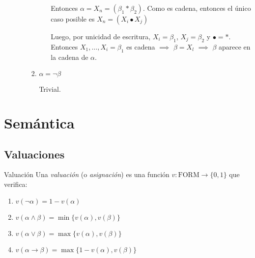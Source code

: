 \begin{itemize}
\begin{itemize}
\begin{enumerate}
\begin{itemize}
                            Entonces $\alpha = X_n = (\beta_1 * \beta_2)$.
                            Como es cadena, entonces el único caso posible
                            es $X_n = (X_i \bullet X_j)$ %

                            Luego, por unicidad de escritura, $X_i = \beta_1$,
                            $X_j = \beta_2$ y $\bullet = *$.
                            Entonces $X_1, \dotsc, X_i = \beta_1$ es cadena
                            $\implies$ $\beta = X_l$
                            $\implies$ $\beta$ aparece en la cadena de
                            $\alpha$.
                    \end{itemize}
                \item $\alpha = \neg \beta$

                    Trivial.
            \end{enumerate}
    \end{itemize}

\end{itemize}

\pagebreak
\section{Semántica}

\subsection{Valuaciones}


\begin{definicion}{Valuación}{}
    Una \textit{valuación} (o \textit{asignación}) es una función 
    $v: \mathrm{FORM} \to \{ 0,1 \}$ que verifica:

    \begin{enumerate}[label=\protect\circled{\arabic*}]
        \item {}%
            $v (\neg \alpha) = 1 - v (\alpha)$
        \item {}%
            $v(\alpha \wedge \beta) = \min \{ v(\alpha), v(\beta) \}$
        \item {}%
            $v(\alpha \vee \beta) 
            = \max \{ v(\alpha), v(\beta) \}$
        \item {}%
            $v (\alpha \to \beta) 
            = \max\{ 1-v(\alpha), v(\beta) \}$
    \end{enumerate}
\end{definicion}

